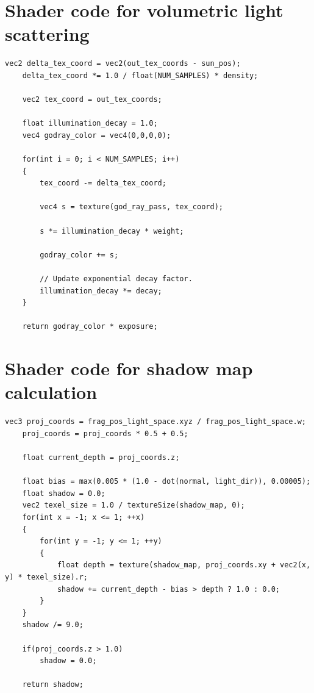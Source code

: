 \documentclass{article}
\begin{document}
	\newpage
	\appendix
	\section{Shader code for volumetric light scattering}
	\label{appendix:godray}
		
	\begin{lstlisting}[basicstyle=\ttfamily\footnotesize, tabsize=4]
	vec2 delta_tex_coord = vec2(out_tex_coords - sun_pos);
	delta_tex_coord *= 1.0 / float(NUM_SAMPLES) * density;
	
	vec2 tex_coord = out_tex_coords;
	
	float illumination_decay = 1.0;
	vec4 godray_color = vec4(0,0,0,0);
	
	for(int i = 0; i < NUM_SAMPLES; i++)
	{
		tex_coord -= delta_tex_coord;
		
		vec4 s = texture(god_ray_pass, tex_coord);
		
		s *= illumination_decay * weight;
		
		godray_color += s;
		
		// Update exponential decay factor.
		illumination_decay *= decay;
	}
	
	return godray_color * exposure;
	\end{lstlisting}
		
	\section{Shader code for shadow map calculation}
	\label{appendix:shadow}
		
	\begin{lstlisting}[basicstyle=\ttfamily\footnotesize, tabsize=4]
	vec3 proj_coords = frag_pos_light_space.xyz / frag_pos_light_space.w;
	proj_coords = proj_coords * 0.5 + 0.5;

	float current_depth = proj_coords.z;
	
	float bias = max(0.005 * (1.0 - dot(normal, light_dir)), 0.00005);
	float shadow = 0.0;
	vec2 texel_size = 1.0 / textureSize(shadow_map, 0);
	for(int x = -1; x <= 1; ++x)
	{
		for(int y = -1; y <= 1; ++y)
		{
			float depth = texture(shadow_map, proj_coords.xy + vec2(x, y) * texel_size).r; 
			shadow += current_depth - bias > depth ? 1.0 : 0.0;        
		}
	}
	shadow /= 9.0;
	
	if(proj_coords.z > 1.0)
		shadow = 0.0;
	
	return shadow;
		
	\end{lstlisting}
  	
\end{document}
